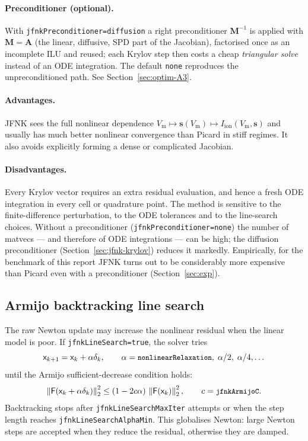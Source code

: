 \documentclass[11pt,a4paper]{article}
\newcommand{\code}[1]{\texttt{\small #1}}
\newcommand{\Vm}{V_{\text{m}}}
\newcommand{\Iion}{I_{\mathrm{ion}}}
\newcommand{\Aimp}{\mathbf{A}}
\newcommand{\Fres}{\mathsf{F}}
\newcommand{\norm}[1]{\left\lVert #1 \right\rVert}
\begin{document}
\paragraph{Preconditioner (optional).}
With \code{jfnkPreconditioner=diffusion} a right preconditioner
$\mathbf{M}^{-1}$ is applied with $\mathbf{M}=\Aimp$ (the linear, diffusive, SPD part of the
Jacobian), factorised once as an incomplete ILU and reused; each Krylov step then
costs a cheap \emph{triangular solve} instead of an ODE
integration. The default \code{none} reproduces the unpreconditioned path.
See Section~\ref{sec:optim-A3}.

\paragraph{Advantages.}
JFNK sees the full nonlinear dependence
$\Vm\mapsto\mathbf{s}(\Vm)\mapsto\Iion(\Vm,\mathbf{s})$ and usually has much better
nonlinear convergence than Picard in stiff regimes. It also avoids
explicitly forming a dense or complicated Jacobian.

\paragraph{Disadvantages.}
Every Krylov vector requires an extra residual evaluation, and hence a
fresh ODE integration in every cell or quadrature point. The method is sensitive
to the finite-difference perturbation, to the ODE tolerances and to the
line-search choices. Without a preconditioner
(\code{jfnkPreconditioner=none}) the number of matvecs --- and therefore of
ODE integrations --- can be high; the diffusion preconditioner
(Section~\ref{sec:jfnk-krylov}) reduces it markedly. Empirically, for the
benchmark of this report JFNK turns out to be considerably more expensive than Picard even with
a preconditioner (Section~\ref{sec:exp}).
\subsection{Armijo backtracking line search}

The raw Newton update may increase the nonlinear residual when the
linear model is poor. If \code{jfnkLineSearch=true}, the solver tries
\[
  \mathsf{x}_{k+1}=\mathsf{x}_{k}+\alpha\delta_{k},
  \qquad
  \alpha=\code{nonlinearRelaxation},\;
  \alpha/2,\;\alpha/4,\dots
\]
until the Armijo sufficient-decrease condition holds:
\begin{equation}
  \norm{\Fres(\mathsf{x}_{k}+\alpha\delta_{k})}_2^2
  \le
  (1-2c\alpha)\,\norm{\Fres(\mathsf{x}_{k})}_2^2,
  \qquad c=\code{jfnkArmijoC}.
  \label{eq:armijo}
\end{equation}
Backtracking stops after \code{jfnkLineSearchMaxIter} attempts or when
the step length reaches \code{jfnkLineSearchAlphaMin}. This globalises Newton:
large Newton steps are accepted when they reduce the residual, otherwise
they are damped.
\end{document}
